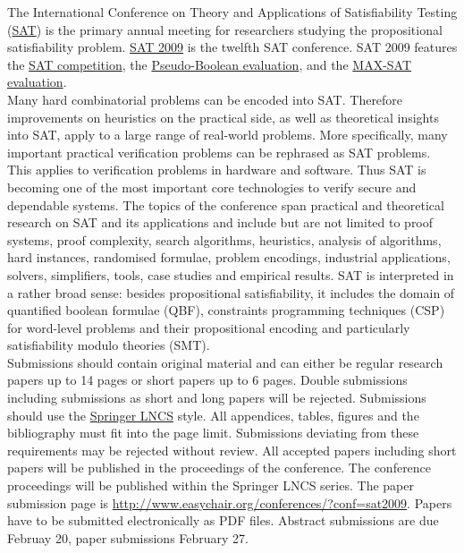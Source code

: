 \documentclass[10pt]{article}
\begin{document}
\begin{minipage}[t]{9.25cm}
  \begin{minipage}[t]{9.25cm}
    \vspace*{0.15cm}
  {\small
  The International Conference on Theory and Applications of
  Satisfiability Testing (\href{http://www.satisfiability.org}{SAT})
  is the primary annual meeting for researchers studying the
  propositional satisfiability
  problem. \href{http://cs-svr1.swan.ac.uk/~csoliver/SAT2009}{SAT
    2009} is the twelfth SAT conference. SAT 2009 features the
  \href{http://www.satcompetition.org/2009}{SAT competition}, the
  \href{http://www.cril.univ-artois.fr/PB09}{Pseudo-Boolean evaluation}, and the
  \href{http://www.maxsat07.udl.es}{MAX-SAT evaluation}. \\[0.1cm]
%
  Many hard combinatorial problems can be encoded into
  SAT. Therefore improvements on heuristics on the practical side, as
  well as theoretical insights into SAT, apply to a large range of
  real-world problems. More specifically, many important practical
  verification problems can be rephrased as SAT problems. This
  applies to verification problems in hardware and software. Thus SAT
  is becoming one of the most important core technologies to verify
  secure and dependable systems. The topics of the conference span
  practical and theoretical research on SAT and its applications and
  include but are not limited to proof systems, proof complexity,
  search algorithms, heuristics, analysis of algorithms, hard
  instances, randomised formulae, problem encodings, industrial
  applications, solvers, simplifiers, tools, case studies and
  empirical results. SAT is interpreted in a rather broad sense:
  besides propositional satisfiability, it includes the domain
  of quantified boolean formulae (QBF), constraints programming
  techniques (CSP) for word-level problems and their propositional
  encoding and particularly satisfiability modulo theories (SMT). \\[0.1cm]
%
  Submissions should contain original material and can either be
  regular research papers up to 14 pages or short papers up to 6
  pages. Double submissions including submissions as short and long
  papers will be rejected.  Submissions should use the 
  \href{http://www.springer.com/comp/lncs/Authors.html}{Springer LNCS}
  style. All appendices, tables, figures and the bibliography 
  must fit into the page limit. Submissions deviating from these
  requirements may be rejected without review. All accepted papers
  including short papers will be published in the proceedings of the
  conference. The conference proceedings will be published within
  the Springer LNCS series. The paper submission page is
  \url{http://www.easychair.org/conferences/?conf=sat2009}. Papers have to
  be submitted electronically as PDF files. Abstract submissions are due
  Februay 20, paper submissions February 27.
  }
  \end{minipage}


\end{minipage}
\end{document}
